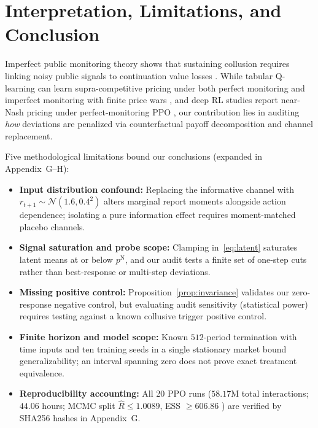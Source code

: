 \documentclass{article}
\begin{document}
\section{Interpretation, Limitations, and Conclusion}

Imperfect public monitoring theory shows that sustaining collusion requires linking noisy public signals to continuation value losses \citep{green1984noncooperative, abreu1990toward, fudenberg1994folk}. While tabular Q-learning can learn supra-competitive pricing under both perfect monitoring \citep{calvano2020artificial} and imperfect monitoring with finite price wars \citep{calvano2021algorithmic}, and deep RL studies report near-Nash pricing under perfect-monitoring PPO \citep{deng2025exploring}, our contribution lies in auditing \emph{how} deviations are penalized via counterfactual payoff decomposition and channel replacement.

Five methodological limitations bound our conclusions (expanded in Appendix~G--H):
\begin{itemize}
\item \textbf{Input distribution confound:} Replacing the informative channel with $r_{t+1}\sim\mathcal{N}(1.6,0.4^2)$ alters marginal report moments alongside action dependence; isolating a pure information effect requires moment-matched placebo channels.
\item \textbf{Signal saturation and probe scope:} Clamping in~\eqref{eq:latent} saturates latent means at or below $p^{\mathrm{N}}$, and our audit tests a finite set of one-step cuts rather than best-response or multi-step deviations.
\item \textbf{Missing positive control:} Proposition~\ref{prop:invariance} validates our zero-response negative control, but evaluating audit sensitivity (statistical power) requires testing against a known collusive trigger positive control.
\item \textbf{Finite horizon and model scope:} Known $512$-period termination with time inputs and ten training seeds in a single stationary market bound generalizability; an interval spanning zero does not prove exact treatment equivalence.
\item \textbf{Reproducibility accounting:} All 20 PPO runs ($58.17$M total interactions; $44.06$ hours; MCMC split $\hat{R}\le 1.0089$, ESS $\ge 606.86$ \citep{vehtari2021rank}) are verified by SHA256 hashes in Appendix~G.
\end{itemize}
\end{document}
